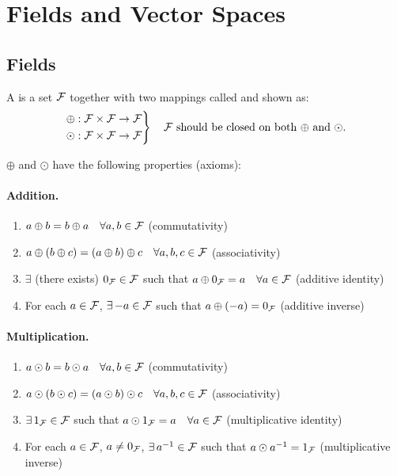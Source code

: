 \section{Fields and Vector Spaces}\label{sec:fields-vs}

\subsection{Fields}\label{ss:fields}

\begin{definition}
A  is a set $\mathcal{F}$ together with two mappings called  and  shown as:
\[
\left.\begin{aligned}
\oplus &: \mathcal{F}\times\mathcal{F}\to\mathcal{F}\\
\odot &: \mathcal{F}\times\mathcal{F}\to\mathcal{F}
\end{aligned}\right\}\quad \text{$\mathcal{F}$ should be closed on both $\oplus$ and $\odot$.}
\]
\end{definition}

$\oplus$ and $\odot$ have the following properties (axioms):

\paragraph{Addition.}
\begin{enumerate}[label=(A\arabic*),leftmargin=3.2em]
\item $a\oplus b = b\oplus a \quad \forall a,b\in\mathcal{F}$ \hfill (commutativity)
\item $a\oplus(b\oplus c) = (a\oplus b)\oplus c \quad \forall a,b,c\in\mathcal{F}$ \hfill (associativity)
\item $\exists$ (there exists) $0_{\mathcal{F}}\in\mathcal{F}$ such that $a\oplus 0_{\mathcal{F}} = a \quad \forall a\in\mathcal{F}$ \hfill (additive identity)
\item For each $a\in\mathcal{F}$, $\exists\,{-a}\in\mathcal{F}$ such that $a\oplus(-a) = 0_{\mathcal{F}}$ \hfill (additive inverse)
\end{enumerate}

\paragraph{Multiplication.}
\begin{enumerate}[label=(M\arabic*),leftmargin=3.2em]
\item $a\odot b = b\odot a \quad \forall a,b\in\mathcal{F}$ \hfill (commutativity)
\item $a\odot(b\odot c) = (a\odot b)\odot c \quad \forall a,b,c\in\mathcal{F}$ \hfill (associativity)
\item $\exists\,1_{\mathcal{F}}\in\mathcal{F}$ such that $a\odot 1_{\mathcal{F}} = a \quad \forall a\in\mathcal{F}$ \hfill (multiplicative identity)
\item For each $a\in\mathcal{F}$, $a\neq 0_{\mathcal{F}}$, $\exists\,a^{-1}\in\mathcal{F}$ such that $a\odot a^{-1} = 1_{\mathcal{F}}$ \hfill (multiplicative inverse)
\end{enumerate}

